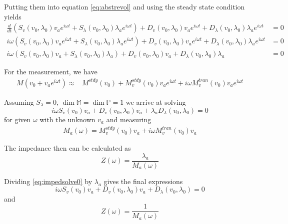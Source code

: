 \documentclass[12pt]{amsproc}
\newcommand{\PP}{\mathbb{P}}
\newcommand{\MM}{\mathbb{M}}
\newcommand{\Exp}[1]{e^{#1}}
\begin{document}
Putting them into equation \eqref{eq:abstrevol}  and using the steady state condition yields
\begin{equation*}
  \begin{split}
    \frac{d}{dt}\left( 
      S_v(v_0,\lambda_0)v_a\Exp{i\omega  t}+
      S_\lambda(v_0,\lambda_0)\lambda_a\Exp{i\omega  t}\right)+ 
    D_v(v_0,\lambda_0)v_a\Exp{i\omega  t}+
    D_\lambda(v_0,\lambda_0)\lambda_a\Exp{i\omega  t}&=0\\
    i\omega\left( 
      S_v(v_0,\lambda_0)v_a\Exp{i\omega  t}+
      S_\lambda(v_0,\lambda_0)\lambda_a\Exp{i\omega  t}\right)+ 
    D_v(v_0,\lambda_0)v_a\Exp{i\omega  t}+
    D_\lambda(v_0,\lambda_0)\lambda_a\Exp{i\omega  t}&=0\\
    i\omega\left( 
      S_v(v_0,\lambda_0)v_a+
      S_\lambda(v_0,\lambda_0)\lambda_a\right)+ 
    D_v(v_0,\lambda_0)v_a+
    D_\lambda(v_0,\lambda_0)\lambda_a&=0
  \end{split}
\end{equation*}


For the measurement, we have
\begin{align*}
      M(v_0+v_a\Exp{i\omega  t})\approx&M^{stdy}(v_0)+ 
    M^{stdy}_v(v_0)v_a\Exp{i\omega  t} +  i\omega M^{tran}_v(v_0)v_a\Exp{i\omega  t}
\end{align*}

Assuming $S_\lambda=0$, $\dim \MM =\dim \PP=1$ we arrive at solving 
\begin{equation}\label{eq:impedsolve0}
    i\omega 
      S_v(v_0)v_a+
    D_v(v_0,\lambda_0)v_a+
    \lambda_a D_\lambda(v_0,\lambda_0)=0
\end{equation}
for given $\omega$ with the unknown $v_a$
and measuring
\begin{align*}
  M_a(\omega)= M^{stdy}_v(v_0)v_a + i\omega M^{tran}_v(v_0)v_a 
\end{align*}

The impedance then can be calculated as 
\begin{equation*}\label{eq:imped0}
  Z(\omega)= \frac{\lambda_a}{M_a(\omega)}
\end{equation*}

Dividing \eqref{eq:impedsolve0} by  $\lambda_a$ gives the final expressions
\begin{equation}\label{eq:impedsolve}
    i\omega 
      S_v(v_0)v_a+
    D_v(v_0,\lambda_0)v_a+
    D_\lambda(v_0,\lambda_0)=0
\end{equation}
and
\begin{equation*}\label{eq:imped}
  Z(\omega)= \frac{1}{M_a(\omega)}
\end{equation*}
\end{document}
